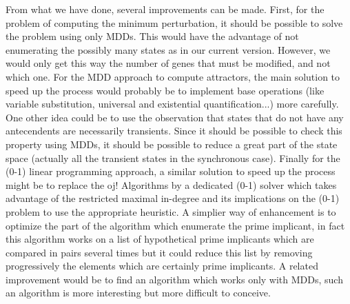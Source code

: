 \documentclass[a4paper,11pt]{article}
\begin{document}
From what we have done, several improvements can be made. First, for the problem
of computing the minimum perturbation, it should be possible to solve the
problem using only MDDs. This would have the advantage of not enumerating the
possibly many states as in our current version. However, we would only get this
way the number of genes that must be modified, and not which one.
For the MDD approach to compute attractors, the main solution to speed up the
process would probably be to implement base operations (like variable substitution, universal and existential quantification...) more carefully.
One other idea could be to use the observation that states that do not have any
antecendents are necessarily transients. Since it should be possible to check
this property using MDDs, it should be possible to reduce a great part of the
state space (actually all the transient states in the synchronous case).
Finally for the (0-1) linear programming approach, a similar solution to speed
up the process might be to replace the oj! Algorithms by a dedicated (0-1)
solver which takes advantage of the restricted maximal in-degree and its
implications on the (0-1) problem to use the appropriate heuristic. A simplier
way of enhancement is to optimize the part of the algorithm which enumerate the
prime implicant, in fact this algorithm works on a list of hypothetical prime
implicants which are compared in pairs several times but it could reduce this
list by removing progressively the elements which are certainly prime
implicants. A related improvement would be to find an algorithm which works
only with MDDs, such an algorithm is more interesting but more difficult to
conceive.





\end{document}
